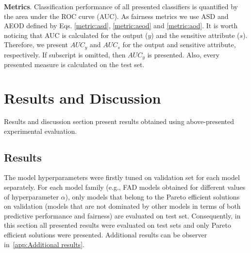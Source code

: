 \documentclass[preprint,12pt]{elsarticle}
\begin{document}
\textbf{Metrics}.
Classification performance of all presented classifiers is quantified by the area under the ROC curve (AUC). As fairness metrics we use ASD and AEOD defined by Eqs. \ref{metric:asd}, \ref{metric:aeod} and \ref{metric:aod}. It is worth noticing that AUC is calculated for the output ($y$) and the sensitive attribute ($s$). Therefore, we present $AUC_y$ and $AUC_s$ for the output and  sensitive attribute, respectively. If subscript is omitted, then $AUC_y$ is presented. Also, every presented measure is calculated on the test set.

\section{Results and Discussion}
\label{sec:ResultsDiscussion}
Results and discussion section present results obtained using above-presented experimental evaluation.

\subsection{Results}
\label{sec:Results}
The model hyperparameters were firstly tuned on validation set for each model separately. For each model family (e.g., FAD models obtained for different values of hyperparameter $\alpha$), only models that belong to the Pareto efficient solutions on validation (models that are not dominated by other models in terms of both predictive performance and fairness) \cite{marler2004survey} are evaluated on test set. Consequently, in this section all presented results were evaluated on test sets and only Pareto efficient solutions were presented. Additional results can be observer in~\ref{app:Additional results}.
\end{document}
